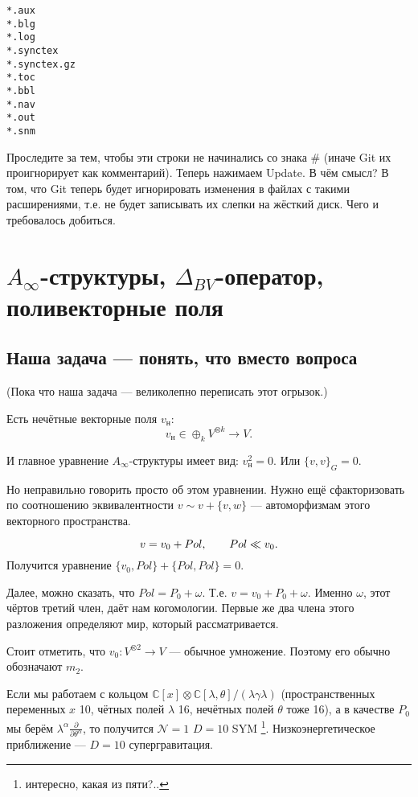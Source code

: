 \documentclass[11pt]{article}
\theoremstyle{remark}
\theoremstyle{definition}
\newcommand{\que}[1]{\footnote{\textcolor[rgb]{0.38,0.69,0.82}{#1}}}
\begin{document}
\begin{verbatim}
*.aux
*.blg
*.log
*.synctex
*.synctex.gz
*.toc
*.bbl
*.nav
*.out
*.snm
\end{verbatim}

Проследите за тем, чтобы эти строки не начинались со знака \# (иначе Git их проигнорирует как комментарий). Теперь нажимаем Update. В чём смысл? В том, что Git теперь будет игнорировать изменения в файлах с такими расширениями, т.е. не будет записывать их слепки на жёсткий диск. Чего и требовалось добиться.

\newpage

\section{$A_{\infty}$-структуры, $\Delta_{BV}$-оператор, поливекторные поля}

\subsection{Наша задача --- понять, что вместо вопроса}

(Пока что наша задача --- великолепно переписать этот огрызок.)

Есть нечётные векторные поля $v_{\text{н}}$: $$v_{\text{н}} \in \oplus_k V^{\otimes k} \to V.$$

И главное уравнение $A_{\infty}$-структуры имеет вид: $v_{\text{н}}^2 = 0.$ Или $\{v,v\}_G = 0.$

Но неправильно говорить просто об этом уравнении. Нужно ещё сфакторизовать по соотношению эквивалентности $v\sim v + \{v,w\}$ --- автоморфизмам этого векторного пространства.

$$v = v_0 + Pol, \hskip 20 pt Pol \ll v_0.$$ Получится уравнение $\{ v_0, Pol \} + \{ Pol, Pol \} = 0.$

Далее, можно сказать, что $Pol = P_0 + \omega$. Т.е. $v = v_0 + P_0 + \omega$. Именно $\omega$, этот чёртов третий член, даёт нам когомологии. Первые же два члена этого разложения определяют мир, который рассматривается.

Стоит отметить, что $v_0: V^{\otimes 2} \to V$ --- обычное умножение. Поэтому его обычно обозначают $m_2$.

Если мы работаем с кольцом $\mathbb{C}[x] \otimes \mathbb{C}[\lambda, \theta] / (\lambda \gamma \lambda)$ (пространственных переменных $x$ 10, чётных полей $\lambda$ 16, нечётных полей $\theta$ тоже 16), а в качестве $P_0$ мы берём $\lambda^{\alpha} \frac{\partial}{\partial \theta^{\alpha}}$, то получится $\mathcal{N} = 1$ $D=10$ SYM \que{интересно, какая из пяти?..}. Низкоэнергетическое приближение --- $D=10$ супергравитация.
\end{document}
